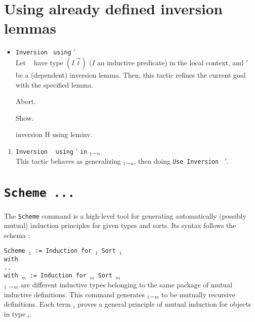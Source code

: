 \section[Using already defined inversion  lemmas]{Using already defined inversion  lemmas\label{inversion_using}}
\begin{itemize}
\item \texttt{Inversion} \ident \texttt{ using} \ident$'$ \\
  Let \ident~ have type $(I~\vec{t})$ ($I$ an inductive
  predicate) in the local context, and \ident$'$ be a (dependent) inversion
  lemma. Then, this tactic refines the current goal with the specified
  lemma. 


\begin{coq_eval}
Abort.
\end{coq_eval}

\begin{coq_example}
Show.
\end{coq_example}
\begin{coq_example}
inversion H using leminv.
\end{coq_example}


\end{itemize}
\variant
\begin{enumerate}
\item \texttt{Inversion} \ident~ \texttt{using} \ident$'$ \texttt{in} \ident$_1$\ldots \ident$_n$\\
This tactic behaves as generalizing  \ident$_1$\ldots \ident$_n$,
then doing \texttt{Use Inversion} \ident~\ident$'$.
\end{enumerate}

\section[\tt Scheme ...]{\tt Scheme ...\label{Scheme}
\label{scheme}}
The {\tt Scheme} command is a high-level tool for generating
automatically (possibly mutual) induction principles for given types
and sorts.  Its syntax follows the schema :

\noindent
{\tt Scheme {\ident$_1$} := Induction for \term$_1$ Sort {\sort$_1$} \\
  with\\
  \mbox{}\hspace{0.1cm} .. \\
        with {\ident$_m$} := Induction for {\term$_m$} Sort
        {\sort$_m$}}\\
\term$_1$ \ldots \term$_m$ are different inductive types belonging to
the same package of mutual inductive definitions. This command
generates {\ident$_1$}\ldots{\ident$_m$} to be mutually recursive
definitions. Each term {\ident$_i$} proves a general principle 
of mutual induction for objects in type {\term$_i$}. 

